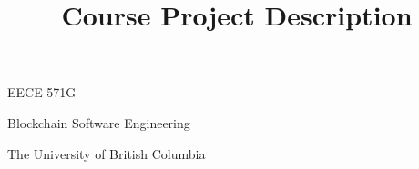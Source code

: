 \documentclass[12pt]{article}
\title{Course Project Description}
\author{}
\date{}
\renewcommand{\_}{\kern-1.5pt\textunderscore\kern-1.5pt}
\begin{document}
\maketitle



\begin{Center}
EECE 571G 
\end{Center}\par

\begin{Center}
Blockchain Software Engineering
\end{Center}\par

\begin{Center}
The University of British Columbia
\end{Center}\par
\end{document}
